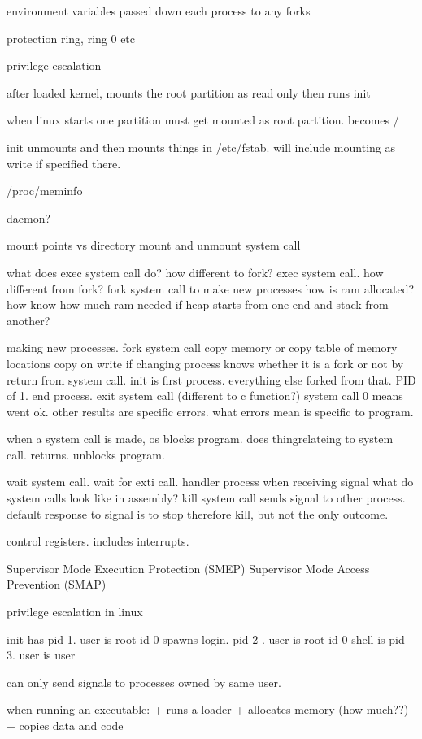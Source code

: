 environment variables passed down each process to any forks

protection ring, ring 0 etc

privilege escalation

after loaded kernel, mounts the root partition as read only
then runs init

when linux starts one partition must get mounted as root partition. becomes /

init unmounts and then mounts things in /etc/fstab. will include mounting as write if specified there.

/proc/meminfo

daemon?

mount points vs directory
mount and unmount system call

what does exec system call do? how different to fork?
exec system call. how different from fork?
fork system call to make new processes
how is ram allocated? how know how much ram needed if heap starts from one end and stack from another?

making new processes. fork system call
copy memory or copy table of memory locations
copy on write if changing
process knows whether it is a fork or not by return from system call.
init is first process. everything else forked from that. PID of 1.
end process. exit system call (different to c function?)
system call 0 means went ok. other results are specific errors.
what errors mean is specific to program.

when a system call is made, os blocks program. does thingrelateing to system call. returns. unblocks program.

wait system call. wait for exti call.
handler process when receiving signal
what do system calls look like in assembly?
kill system call sends signal to other process. default response to signal is to stop therefore kill, but not the only outcome.

control registers. includes interrupts.

Supervisor Mode Execution Protection (SMEP)
Supervisor Mode Access Prevention (SMAP)

privilege escalation in linux


init has pid 1. user is root id 0
spawns login. pid 2 . user is root id 0
shell is pid 3. user is user

can only send signals to processes owned by same user.

when running an executable:
+ runs a loader
+ allocates memory (how much??)
+ copies data and code

